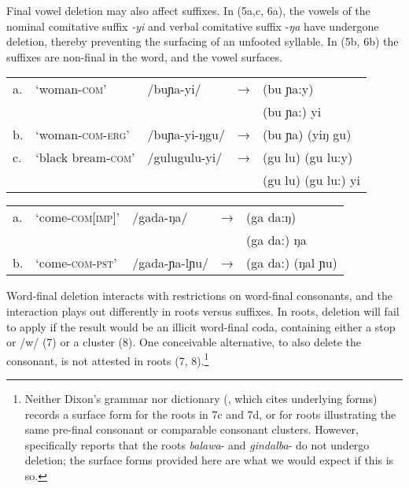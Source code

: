 \documentclass[output=paper,
modfonts
]{LSP/langsci}
\begin{document}
\noindent Final vowel deletion may also affect suffixes. In (5a,c, 6a), the vowels of the nominal comitative suffix \textit{-yi} and verbal comitative suffix -\textit{ŋa} have undergone deletion, thereby preventing the surfacing of an unfooted syllable. In (5b, 6b) the suffixes are non-final in the word, and the vowel surfaces. 

\ea
\begin{tabular}[t]{@{}lllll}
a. &  `woman\textsc{-com}' & /buɲa-yi/  & → & (bu ɲa:y) \\
&&&&\ljudge{*}(bu ɲa:) yi \\
b.  &`woman-\textsc{com-erg'} & /buɲa-yi-ŋgu/  & → & (bu ɲa) (yiŋ gu) \\
c.  &`black bream-\textsc{com}' & /gulugulu-yi/  & → & (gu lu) (gu lu:y) \\
 & & & & \ljudge{*}(gu lu) (gu lu:) yi\\
\end{tabular}

\ex
\begin{tabular}[t]{@{}lllll}
a. & `come\textsc{-com[imp]}' & /gada-ŋa/  & → & (ga da:ŋ) \\
&&&& \ljudge{*}(ga da:) ŋa\\
b. & `come-\textsc{com-pst}' & /gada-ɲa-lɲu/  & → & (ga da:) (ŋal ɲu) \\
\end{tabular}
\z


Word-final deletion interacts with restrictions on word-final consonants, and the interaction plays out differently in roots versus suffixes. In roots, deletion will fail to apply if the result would be an illicit word-final coda, containing either a stop or /w/ (7) or a cluster (8). One conceivable alternative, to also delete the consonant, is not attested in roots (7, 8).\footnote{Neither Dixon's grammar \citeyearpar{dixon1977a} nor dictionary (\citealt{dixon1991}, which cites underlying forms) records a surface form for the roots in 7c and 7d, or for roots illustrating the same pre-final consonant or comparable consonant clusters. However, \citet[57--58]{dixon1977a} specifically reports that the roots \textit{balawa}- and \textit{gindalba}- do not undergo deletion; the surface forms provided here are what we would expect if this is so.}
\end{document}
